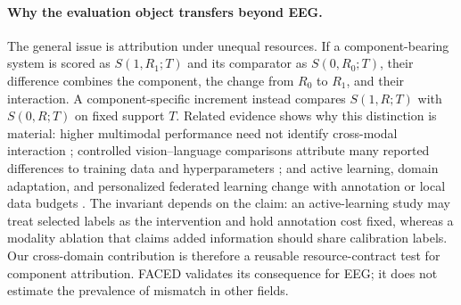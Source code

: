 \paragraph{Why the evaluation object transfers beyond EEG.}
The general issue is attribution under unequal resources. If a component-bearing
system is scored as $S(1,R_1;T)$ and its comparator as $S(0,R_0;T)$, their
difference combines the component, the change from $R_0$ to $R_1$, and their
interaction. A component-specific increment instead compares $S(1,R;T)$ with
$S(0,R;T)$ on fixed support $T$. Related evidence shows why this distinction is
material: higher multimodal performance need not identify cross-modal
interaction \citep{hessel2020interactions}; controlled vision--language
comparisons attribute many reported differences to training data and
hyperparameters \citep{bugliarello2021unmasked}; and active learning, domain
adaptation, and personalized federated learning change with annotation or local
data budgets \citep{hacohen2022budget,bai2021pretrain,marfoq2022local}.
The invariant depends on the claim: an active-learning study may treat selected
labels as the intervention and hold annotation cost fixed, whereas a modality
ablation that claims added information should share calibration labels. Our
cross-domain contribution is therefore a reusable resource-contract test for
component attribution. FACED validates its consequence for EEG; it does not
estimate the prevalence of mismatch in other fields.
